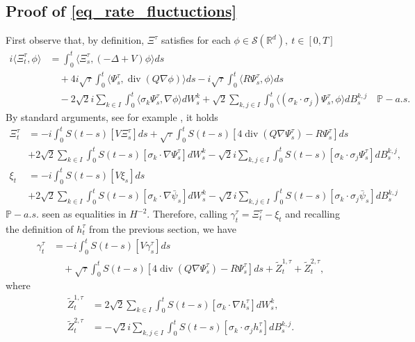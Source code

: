 \documentclass[a4paper,10pt]{amsart}
\newcommand{\R}{\mathbb{R}}
\theoremstyle{remark}
\numberwithin{equation}{section}
\begin{document}
\subsection{\texorpdfstring{Proof of \eqref{eq_rate_fluctuctions}}{Proof of the fluctuation rate}}
First observe that, by definition, $\Xi^{\tau}$ satisfies for each $\phi\in \mathscr{S}(\R^d),\ t\in [0,T]$
\begin{align*}
  i \langle\Xi^{\tau}_t,\phi\rangle
  &=\int_0^t\langle \Xi^{\tau}_s,(-\Delta+V)\phi\rangle ds\\
  &\quad+4i\sqrt{\tau}\int_0^t
  \langle \Psi^{\tau}_s,\operatorname{div}(Q\nabla\phi)\rangle ds
  -i\sqrt{\tau}\int_0^t\langle R\Psi^{\tau}_s,\phi\rangle ds\\
  &\quad-2\sqrt{2}i\sum_{k\in I}\int_0^t
  \langle\sigma_k\Psi^{\tau}_s,\nabla\phi\rangle dW^k_s+\sqrt{2}\sum_{k,j\in I}\int_0^t
  \langle(\sigma_k\cdot\sigma_j)\Psi^{\tau}_s,\phi\rangle dB^{k,j}_s
  \quad\mathbb{P}-a.s.
\end{align*}
By standard arguments, see for example \cite[Section 5.2]{da2014stochastic}, it holds
\begin{align*}
    \Xi^{\tau}_t&=-i\int_0^tS(t-s)[V\Xi^{\tau}_s]ds+\sqrt{\tau}\int_0^t S(t-s)[4\operatorname{div}(Q\nabla\Psi^{\tau}_s)-R\Psi^{\tau}_s]ds\\&+2\sqrt{2}\sum_{k\in I}\int_0^t S(t-s)[\sigma_k\cdot\nabla\Psi^{\tau}_s]dW^k_s-\sqrt{2}i\sum_{k,j\in I}\int_0^t S(t-s)[\sigma_k\cdot\sigma_j \Psi^{\tau}_s]dB^{k,j}_s,\\
    \xi_t&=-i\int_0^tS(t-s)[V\xi_s]ds\\&+2\sqrt{2}\sum_{k\in I}\int_0^t S(t-s)[\sigma_k\cdot\nabla\bar\psi_s]dW^k_s-\sqrt{2}i\sum_{k,j\in I}\int_0^t S(t-s)[\sigma_k\cdot\sigma_j \bar\psi_s]dB^{k,j}_s
\end{align*}
$\mathbb{P}-a.s.$ seen as equalities in $H^{-2}.$ Therefore, calling $\gamma^{\tau}_t=\Xi^{\tau}_t-\xi_t $ and recalling the definition of $h^{\tau}_t$ from the previous section, we have
\begin{align*}
    \gamma^{\tau}_t
    &=-i\int_0^tS(t-s)[V\gamma^{\tau}_s]ds\\
    &\quad+\sqrt{\tau}\int_0^t S(t-s)
    [4\operatorname{div}(Q\nabla\Psi^{\tau}_s)-R\Psi^{\tau}_s]ds
    +\tilde{Z}^{1,\tau}_t+\tilde{Z}^{2,\tau}_t,
\end{align*}
    where
    \begin{align*}
    \tilde{Z}^{1,\tau}_t&=2\sqrt{2}\sum_{k\in I}\int_0^t S(t-s)[\sigma_k\cdot\nabla h^{\tau}_s]dW^k_s,\\ \tilde{Z}^{2,\tau}_t&=-\sqrt{2}i\sum_{k,j\in I}\int_0^t S(t-s)[\sigma_k\cdot\sigma_j h^{\tau}_s]dB^{k,j}_s.
\end{align*}
\end{document}
